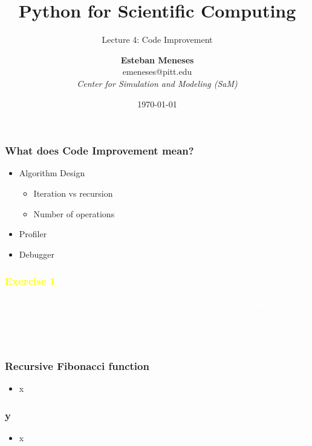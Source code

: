 \documentclass[xcolor=table,10pt,final]{beamer}
\begin{document}


\title{Python for Scientific Computing}
\subtitle{Lecture 4: Code Improvement}
\author{{\bf Esteban Meneses}\\emeneses@pitt.edu\\{\em Center for Simulation and Modeling (SaM)}}
\date{\today}
\frame{\titlepage}

\begin{frame}
	\frametitle{What does Code Improvement mean?}
	\begin{itemize}
		\item Algorithm Design
		\begin{itemize}
			\item Iteration vs recursion
			\item Number of operations
		\end{itemize}
		\item Profiler
		\item Debugger
	\end{itemize}
\end{frame}

{
\begin{frame}
	\frametitle{\textcolor{yellow}{Exercise 1}}
	\textcolor{white}{Write a Python function to compute the \emph{n-th Fibonacci} number.\newline\newline
	 {\tt fibonacci(0) = 0\\
	 fibonacci(1) = 1\\
	 fibonacci(n) = fibonacci(n-1) + fibonacci(n-2)}
	}
\end{frame}
}

\begin{frame}
	\frametitle{Recursive Fibonacci function}
	\begin{itemize}
		\item x
	\end{itemize}
\end{frame}

\begin{frame}
	\frametitle{y}
	\begin{itemize}
		\item x
	\end{itemize}
\end{frame}
\end{document}
